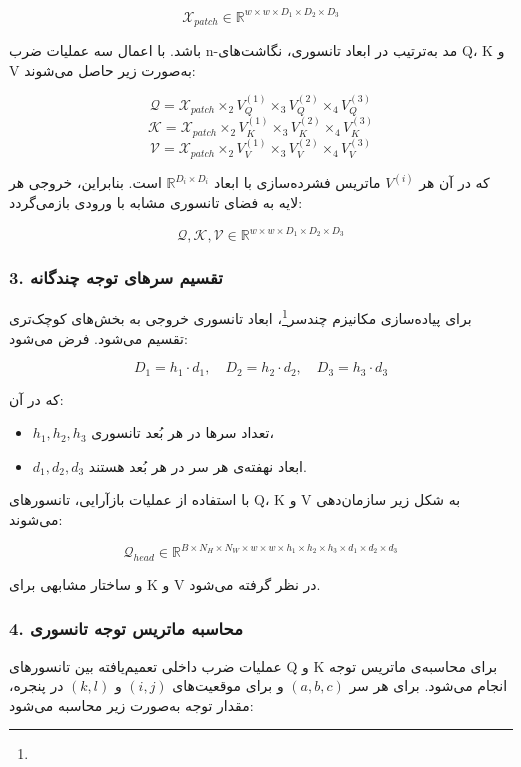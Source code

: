 \[
\mathcal{X}_{patch} \in \mathbb{R}^{w \times w \times D_1 \times D_2 \times D_3}
\]

باشد. با اعمال سه عملیات ضرب n-مد به‌ترتیب در ابعاد تانسوری، نگاشت‌های Q، K و V به‌صورت زیر حاصل می‌شوند:

\[
\mathcal{Q} = \mathcal{X}_{patch} \times_2 V_Q^{(1)} \times_3 V_Q^{(2)} \times_4 V_Q^{(3)}
\]
\[
\mathcal{K} = \mathcal{X}_{patch} \times_2 V_K^{(1)} \times_3 V_K^{(2)} \times_4 V_K^{(3)}
\]
\[
\mathcal{V} = \mathcal{X}_{patch} \times_2 V_V^{(1)} \times_3 V_V^{(2)} \times_4 V_V^{(3)}
\]

که در آن هر $V^{(i)}$ ماتریس فشرده‌سازی با ابعاد $\mathbb{R}^{D_i \times D_i}$ است. بنابراین، خروجی هر لایه به فضای تانسوری مشابه با ورودی بازمی‌گردد:

\[
\mathcal{Q}, \mathcal{K}, \mathcal{V} \in \mathbb{R}^{w \times w \times D_1 \times D_2 \times D_3}
\]

\subsubsection*{3. تقسیم سرهای توجه چندگانه}

برای پیاده‌سازی مکانیزم چندسر\footnote{}، ابعاد تانسوری خروجی به بخش‌های کوچک‌تری تقسیم می‌شود. فرض می‌شود:

\[
D_1 = h_1 \cdot d_1, \quad D_2 = h_2 \cdot d_2, \quad D_3 = h_3 \cdot d_3
\]

که در آن:
\begin{itemize}
	\item $h_1, h_2, h_3$ تعداد سرها در هر بُعد تانسوری،
	\item $d_1, d_2, d_3$ ابعاد نهفته‌ی هر سر در هر بُعد هستند.
\end{itemize}

با استفاده از عملیات بازآرایی، تانسورهای Q، K و V به شکل زیر سازمان‌دهی می‌شوند:

\[
\mathcal{Q}_{head} \in \mathbb{R}^{B \times N_H \times N_W \times w \times w \times h_1 \times h_2 \times h_3 \times d_1 \times d_2 \times d_3}
\]

و ساختار مشابهی برای K و V در نظر گرفته می‌شود.

\subsubsection*{4. محاسبه ماتریس توجه تانسوری}

عملیات ضرب داخلی تعمیم‌یافته بین تانسورهای Q و K برای محاسبه‌ی ماتریس توجه انجام می‌شود. برای هر سر $(a,b,c)$ و برای موقعیت‌های $(i,j)$ و $(k,l)$ در پنجره، مقدار توجه به‌صورت زیر محاسبه می‌شود:

